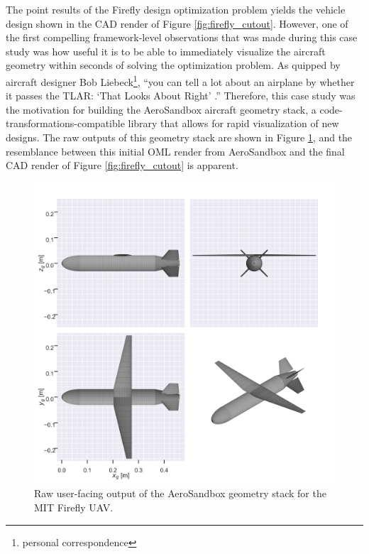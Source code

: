 The point results of the Firefly design optimization problem yields the vehicle design shown in the CAD render of Figure \ref{fig:firefly_cutout}. However, one of the first compelling framework-level observations that was made during this case study was how useful it is to be able to immediately visualize the aircraft geometry within seconds of solving the optimization problem. As quipped by aircraft designer Bob Liebeck\footnote{personal correspondence}, ``you can tell a lot about an airplane by whether it passes the TLAR: `That Looks About Right' .'' Therefore, this case study was the motivation for building the AeroSandbox aircraft geometry stack, a code-transformations-compatible library that allows for rapid visualization of new designs. The raw outputs of this geometry stack are shown in Figure \ref{fig:firefly_geometry}, and the resemblance between this initial OML render from AeroSandbox and the final CAD render of Figure \ref{fig:firefly_cutout} is apparent.

\begin{figure}[h]
    \centering
    \includegraphics[width=\textwidth]{../figures/firefly_geometry.png}
    \caption{Raw user-facing output of the AeroSandbox geometry stack for the MIT Firefly UAV.}
    \label{fig:firefly_geometry}
\end{figure}

